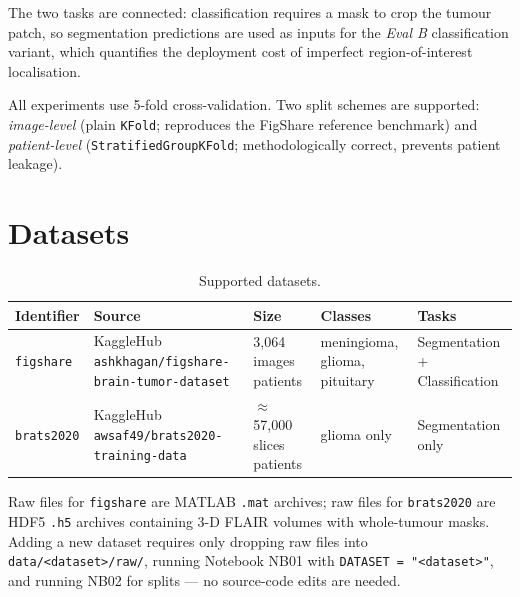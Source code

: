 \documentclass[12pt,a4paper]{article}
\begin{document}
The two tasks are connected: classification requires a mask to crop the tumour
patch, so segmentation predictions are used as inputs for the
\emph{Eval B} classification variant, which quantifies the deployment cost of
imperfect region-of-interest localisation.

All experiments use 5-fold cross-validation.  Two split schemes are supported:
\textit{image-level} (plain \texttt{KFold}; reproduces the FigShare reference
benchmark) and \textit{patient-level} (\texttt{StratifiedGroupKFold};
methodologically correct, prevents patient leakage).

\section{Datasets}

\begin{table}[h]
  \centering
  \caption{Supported datasets.}
  \label{tab:datasets}
  \begin{tabular}{L{3cm} L{3cm} L{2.5cm} L{3cm} L{3cm}}
    \toprule
    \textbf{Identifier} & \textbf{Source} & \textbf{Size} & \textbf{Classes} &
    \textbf{Tasks} \\
    \midrule
    \texttt{figshare}
      & KaggleHub \newline \texttt{ashkhagan/figshare-brain-tumor-dataset}
      & 3{,}064 images  patients
      & meningioma, glioma, pituitary
      & Segmentation + Classification \\
    \addlinespace
    \texttt{brats2020}
      & KaggleHub \newline \texttt{awsaf49/brats2020-training-data}
      & $\approx$57{,}000 slices  patients
      & glioma only
      & Segmentation only \\
    \bottomrule
  \end{tabular}
\end{table}

Raw files for \texttt{figshare} are MATLAB \texttt{.mat} archives; raw files for
\texttt{brats2020} are HDF5 \texttt{.h5} archives containing 3-D FLAIR volumes
with whole-tumour masks.  Adding a new dataset requires only dropping raw files
into \texttt{data/<dataset>/raw/}, running Notebook NB01 with
\texttt{DATASET = "<dataset>"}, and running NB02 for splits --- no source-code
edits are needed.
\end{document}
